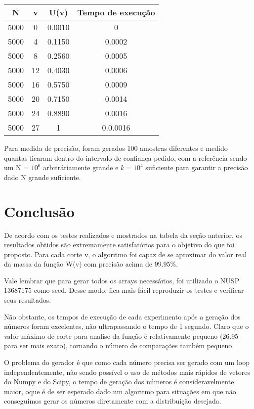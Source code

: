 \documentclass{article}
\begin{document}
        \begin{table}[t]
            \centering
        \begin{tabular}{|c|c|c|c|}
            N & v & U(v) & Tempo de execução\\
            \hline
            5000 & 0 & 0.0010 & 0 \\
            5000 & 4 & 0.1150 & 0.0002 \\
            5000 & 8 & 0.2560 & 0.0005 \\
            5000 & 12 & 0.4030 & 0.0006 \\
            5000 & 16 & 0.5750 & 0.0009 \\
            5000 & 20 & 0.7150 & 0.0014 \\
            5000 & 24 & 0.8890 & 0.0016 \\
            5000 & 27 & 1 & 0.0.0016 \\
        \end{tabular}
    \end{table}
   Para medida de precisão, foram gerados 100 amostras diferentes e medido quantas ficaram dentro do intervalo de confiança pedido, com a referência sendo um N = $10^6$ arbitráriamente grande e $k = 10^4$ suficiente para garantir a precisão dado N grande suficiente.

    \section{Conclusão}

    De acordo com os testes realizados e mostrados na tabela da seção anterior,
    os resultados obtidos são extremamente satisfatórios para o objetivo do que foi
    proposto. Para cada corte v, o algoritmo foi capaz de se aproximar do valor
    real da massa da função W(v) com precisão acima de 99.95\%.

    Vale lembrar que para gerar todos os arrays necessários, foi utilizado o NUSP
    13687175 como seed. Desse modo, fica mais fácil reproduzir os testes e verificar
    seus resultados.


    Não obstante, os tempos de execução de cada experimento após a geração dos números foram excelentes,
    não ultrapassando o tempo de 1 segundo. Claro que o valor máximo de corte
    para analise da função é relativamente pequeno (26.95 para ser mais exato),
    tornando o número de comparações também pequeno.

    O problema do gerador é que como cada número precisa ser gerado com um loop independentemente, não sendo possível
    o uso de métodos mais rápidos de vetores do Numpy e do Scipy, o tempo de geração dos números
    é consideravelmente maior, oque é de ser esperado dado um algoritmo para situações em que não conseguimos gerar
    os números diretamente com a distribuição desejada.
\end{document}
